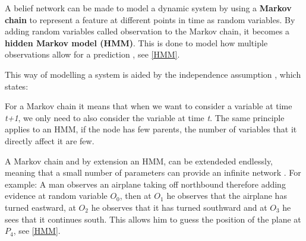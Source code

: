 A belief network can be made to model a dynamic system by using a \textbf{Markov
chain} to represent a feature at different points in time as random
variables. By adding random variables called observation to the
Markov chain, it becomes a \textbf{hidden Markov model (HMM)}. This is done to
model how multiple observations allow for a prediction
\citep[ch.6.5.2]{MIBook}, see \autoref{HMM}.

This way of modelling a system is aided by the independence assumption
\citep[p.240]{MIBook}, which states:
 
 \begin{center}
 \begin{minipage}{0.8\linewidth}
 \end{minipage}
 \end{center}
 
For a Markov chain it means that when we want to consider a variable at time
\textit{t+1}, we only need to also consider the variable at time
\textit{t}. The same principle applies to an HMM, if the node has few parents,
the number of variables that it directly affect it are few.\nl

A Markov chain and by extension an HMM, can be extendeded endlessly, meaning
that a small number of parameters can provide an infinite network
\citep[ch.6.5.1]{MIBook}. For example: A man observes an airplane taking off
northbound therefore adding evidence at random variable $O_0$, then at $O_1$ he
observes that the airplane has turned eastward, at $O_2$ he observes that it
has turned southward and at $O_3$ he sees that it continues south. This allows
him to guess the position of the plane at $P_4$, see \autoref{HMM}. 





% 
